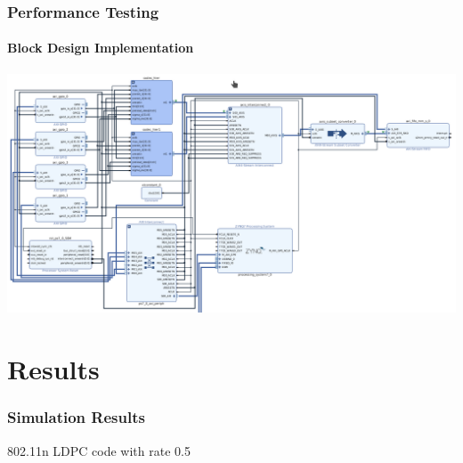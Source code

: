 \documentclass[	%
				]{beamer}
\begin{document}
\begin{frame}
	\frametitle{Performance Testing}
	\framesubtitle{Block Design Implementation}
	\includegraphics[width=\textwidth]{vivado_block_top.png}
\end{frame}

\section{Results}
\newcommand{\addgraph}[2]{\addplot table [col sep=tab,x index={0}, y index={#2}] {#1};
	\pgfplotstablegetcolumnnamebyindex{#2}\of{#1}\to{\colname}
	\addlegendentryexpanded{\colname}}
\basesim
\begin{frame}
	\frametitle{Simulation Results}
	802.11n LDPC code with rate 0.5
	\centering
\end{frame}


\newcommand{\cleanaddgraph}[2]{\addplot table [mark=none,col sep=tab,x index={0}, y index={#2}] {#1};
	\pgfplotstablegetcolumnnamebyindex{#2}\of{#1}\to{\colname}
	\addlegendentryexpanded{\colname}
}
\end{document}
